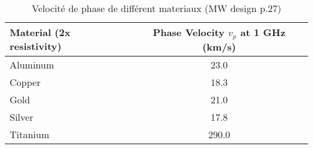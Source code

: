 \begin{table}
    \caption{Velocité de phase de différent materiaux (MW design p.27)}
    \begin{tabular}{l|c}
        \toprule
        Material (2x resistivity) & \makecell{Phase Velocity\\$v_p$ at 1 GHz (km/s)} \\
        \midrule
        \hline
        Aluminum & 23.0 \\
        Copper & 18.3 \\
        Gold & 21.0 \\
        Silver & 17.8 \\
        Titanium & 290.0 \\
        \bottomrule
    \end{tabular}
\end{table}